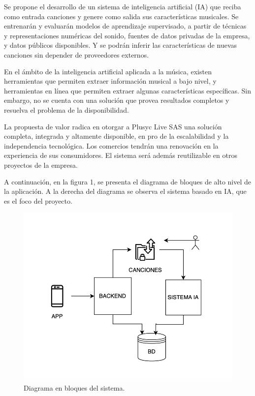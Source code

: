 \documentclass[
11pt, %
]{charter}
\begin{document}
Se propone el desarrollo de un sistema de inteligencia artificial (IA) que reciba como entrada canciones y genere como salida sus características musicales. Se entrenarán y evaluarán modelos de aprendizaje supervisado, a partir de técnicas y representaciones numéricas del sonido, fuentes de datos privadas de la empresa, y datos públicos disponibles. Y se podrán inferir las características de nuevas canciones sin depender de proveedores externos.

En el ámbito de la inteligencia artificial aplicada a la música, existen herramientas que permiten extraer información musical a bajo nivel, y herramientas en línea que permiten extraer algunas características específicas. Sin embargo, no se cuenta con una solución que provea resultados completos y resuelva el problema de la disponibilidad.

La propuesta de valor radica en otorgar a Plusyc Live SAS una solución completa, integrada y altamente disponible, en pro de la escalabilidad y la independencia tecnológica. Los comercios tendrán una renovación en la experiencia de sus consumidores. El sistema será además reutilizable en otros proyectos de la empresa.

A continuación, en la figura 1, se presenta el diagrama de bloques de alto nivel de la aplicación. A la derecha del diagrama se observa el sistema basado en IA, que es el foco del proyecto. 


\begin{figure}[htpb]
\centering 
\includegraphics[width=.65\textwidth]{./Figuras/diagBloques.png}
\caption{Diagrama en bloques del sistema.}
\label{fig:diagBloques}
\end{figure}
\end{document}
